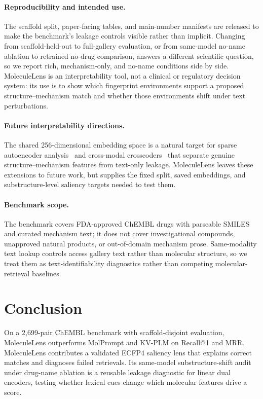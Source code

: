 \documentclass{article}
\begin{document}
\paragraph{Reproducibility and intended use.}
The scaffold split, paper-facing tables, and main-number manifests are released to make the benchmark's leakage controls visible rather than implicit. Changing from scaffold-held-out to full-gallery evaluation, or from same-model no-name ablation to retrained no-drug comparison, answers a different scientific question, so we report rich, mechanism-only, and no-name conditions side by side. MoleculeLens is an interpretability tool, not a clinical or regulatory decision system: its use is to show which fingerprint environments support a proposed structure--mechanism match and whether those environments shift under text perturbations.

\paragraph{Future interpretability directions.}
The shared 256-dimensional embedding space is a natural target for sparse autoencoder analysis~\citep{templeton2024monosemanticity,bricken2023monosemanticity} and cross-modal crosscoders~\citep{lindsey2025attribution} that separate genuine structure--mechanism features from text-only leakage. MoleculeLens leaves these extensions to future work, but supplies the fixed split, saved embeddings, and substructure-level saliency targets needed to test them.

\paragraph{Benchmark scope.}
The benchmark covers FDA-approved ChEMBL drugs with parseable SMILES and curated mechanism text; it does not cover investigational compounds, unapproved natural products, or out-of-domain mechanism prose. Same-modality text lookup controls access gallery text rather than molecular structure, so we treat them as text-identifiability diagnostics rather than competing molecular-retrieval baselines.

\section{Conclusion}

On a 2,699-pair ChEMBL benchmark with scaffold-disjoint evaluation, MoleculeLens outperforms MolPrompt and KV-PLM on Recall@1 and MRR. MoleculeLens contributes a validated ECFP4 saliency lens that explains correct matches and diagnoses failed retrievals. Its same-model substructure-shift audit under drug-name ablation is a reusable leakage diagnostic for linear dual encoders, testing whether lexical cues change which molecular features drive a score.
\end{document}
